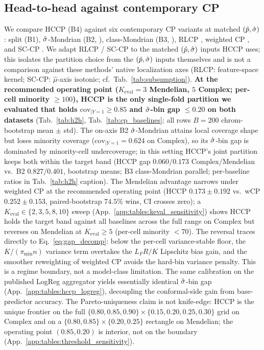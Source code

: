 \subsection{Head-to-head against contemporary CP}
\label{sec:experiments:h2h}

We compare HCCP (B4) against six contemporary CP variants at matched $(\hat{p}, \hat{\sigma})$: split (B1), $\hat{\sigma}$-Mondrian (B2, \citep{bostrom2020mondrian}), class-Mondrian (B3, \citep{sadinle2019lac}), RLCP \citep{hore2025rlcp}, weighted CP \citep{tibshirani2019weighted}, and SC-CP \citep{vanderlaan2024sccp}. We adapt RLCP / SC-CP to the matched $(\hat{p}, \hat{\sigma})$ inputs HCCP uses; this isolates the partition choice from the $(\hat{p}, \hat{\sigma})$ inputs themselves and is not a comparison against these methods' native localization axes (RLCP: feature-space kernel; SC-CP: $\hat\mu$-axis isotonic; cf.\ Tab.~\ref{tab:subsumption}). \textbf{At the recommended operating point ($K_{\mathrm{eval}} = 3$ Mendelian, $5$ Complex; per-cell minority $\geq 100$), HCCP is the only single-fold partition we evaluated that holds $\mathrm{cov}_{|Y=1} \geq 0.85$ and $\hat{\sigma}$-bin gap $\leq 0.20$ on both datasets} (Tab.~\ref{tab:h2h}, Tab.~\ref{tab:cp_baselines}; all rows $B=200$ chrom-bootstrap mean $\pm$ std). The on-axis B2 $\hat{\sigma}$-Mondrian \citep{bostrom2020mondrian} attains local coverage shape but loses minority coverage ($\mathrm{cov}_{|Y=1} = 0.624$ on Complex), so its $\hat{\sigma}$-bin gap is dominated by minority-cell undercoverage; in this setting HCCP's joint partition keeps both within the target band (HCCP gap $0.060 / 0.173$ Complex/Mendelian vs.\ B2 $0.827 / 0.401$, bootstrap means; B3 class-Mondrian \citep{sadinle2019lac} parallel; per-baseline ratios in Tab.~\ref{tab:h2h} caption).
The Mendelian advantage narrows under weighted CP at the recommended operating point (HCCP $0.173 \pm 0.192$ vs.\ wCP $0.252 \pm 0.153$, paired-bootstrap $74.5\%$ wins, CI crosses zero); a $K_{\mathrm{eval}} \in \{2,3,5,8,10\}$ sweep (App.~\ref{app:tables:keval_sensitivity}) shows HCCP holds the target band against all baselines across the full range on Complex but reverses on Mendelian at $K_{\mathrm{eval}} \geq 5$ (per-cell minority $< 70$).
The reversal traces directly to Eq.~\eqref{eq:gap_decomp}: below the per-cell variance-stable floor, the $K / (\pi_{\min} n)$ variance term overtakes the $L_F R / K$ Lipschitz bias gain, and the smoother reweighting of weighted CP avoids the hard-bin variance penalty. This is a regime boundary, not a model-class limitation. The same calibration on the published LogReg aggregator yields essentially identical $\hat{\sigma}$-bin gap (App.~\ref{app:tables:hccp_logreg}), decoupling the conformal-side gain from base-predictor accuracy. The Pareto-uniqueness claim is not knife-edge: HCCP is the unique frontier on the full $\{0.80, 0.85, 0.90\} \times \{0.15, 0.20, 0.25, 0.30\}$ grid on Complex and on a $\{0.80, 0.85\} \times \{0.20, 0.25\}$ rectangle on Mendelian; the operating point $(0.85, 0.20)$ is interior, not on the boundary (App.~\ref{app:tables:threshold_sensitivity}).

